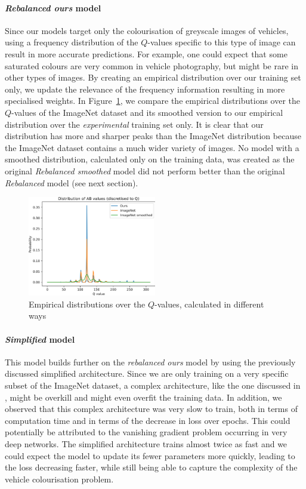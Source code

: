 \documentclass{article}
\begin{document}
\paragraph{\textit{Rebalanced ours} model}
Since our models target only the colourisation of greyscale images of vehicles, using a frequency distribution of the $Q$-values specific
to this type of image can result in more accurate predictions. For example, one could expect that some saturated colours are very common
in vehicle photography, but might be rare in other types of images. By creating an empirical distribution over our training set
only, we update the relevance of the frequency information resulting in more specialised weights. In Figure~\ref{fig:distribution},
we compare the empirical distributions over the $Q$-values of the ImageNet dataset and its smoothed version to
our empirical distribution over the \textit{experimental} training set only.
It is clear that our distribution has more and sharper peaks than the ImageNet distribution because
the ImageNet dataset contains a much wider variety of images.
No model with a smoothed distribution, calculated only on the training data, was created as the original
\textit{Rebalanced smoothed} model did not perform better than the original \textit{Rebalanced} model (see next section).

\begin{figure}
    \centering
    \includegraphics[width=0.5\textwidth]{GRAPHS/distribution.png}
    \caption{Empirical distributions over the $Q$-values, calculated in different ways}
    \label{fig:distribution}
\end{figure}

\paragraph{\textit{Simplified} model}
This model builds further on the \textit{rebalanced ours} model by using the previously discussed simplified architecture.
Since we are only training on a very specific subset of the ImageNet dataset, a complex architecture,
like the one discussed in \cite{colourful}, might be overkill and might even overfit the training data.
In addition, we observed that this complex architecture was very slow to train, both in terms of computation time
and in terms of the decrease in loss over epochs. This could potentially be attributed to the vanishing gradient problem
occurring in very deep networks.
The simplified architecture trains almost twice as fast and we could expect the model to update its fewer parameters more quickly,
leading to the loss decreasing faster, while still being able to capture the complexity of the vehicle colourisation problem.
\end{document}
